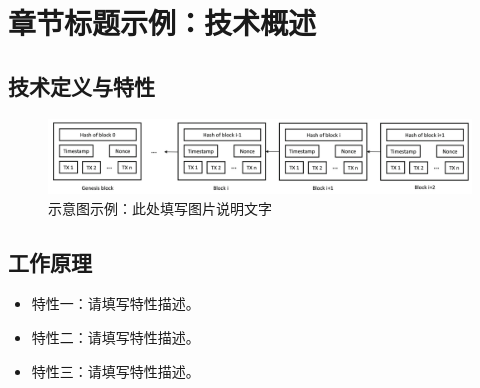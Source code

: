 \section{章节标题示例：技术概述}

\subsection{技术定义与特性}


\begin{figure}[htbp]
    \centering
    \includegraphics[width=\textwidth]{Imgs/BlockChain.png}
    \caption{示意图示例：此处填写图片说明文字}
    \label{fig:example_structure}
\end{figure}


\subsection{工作原理}


\begin{itemize}
    \item 特性一：请填写特性描述。
    \item 特性二：请填写特性描述。
    \item 特性三：请填写特性描述。
\end{itemize}

